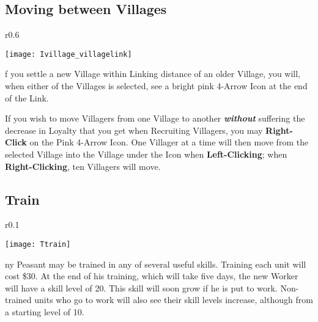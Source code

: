 \subsection{\textsf{Moving between Villages}}


\begin{wrapfigure}{r}{0.6\textwidth}
    \vspace{-20pt}
    \begin{center}
        \texttt{[image: Ivillage\_villagelink]} %
    \end{center}
    \vspace{-20pt}
\end{wrapfigure}

f you settle a new Village within Linking distance of an older Village, you will, when either of the Villages is selected, see a bright pink 4-Arrow Icon at the end of the Link.

If you wish to move Villagers from one Village to another \textbf{\textit{without}} suffering the decrease in Loyalty that you get when Recruiting Villagers, you may \textbf{Right-Click} on the Pink 4-Arrow Icon. One Villager at a time will then move from the selected Village into the Village under the Icon when \textbf{Left-Clicking}; when \textbf{Right-Clicking}, ten Villagers will move.

\subsection{Train}


\begin{wrapfigure}{r}{0.1\textwidth}
    \vspace{-20pt}
    \begin{center}
        \texttt{[image: Ttrain]}
    \end{center}
    \vspace{-20pt}
\end{wrapfigure}

ny Peasant may be trained in any of several useful skills. Training each unit will cost \$30. At the end of his training, which will take five days, the new Worker will have a skill level of 20. This skill will soon grow if he is put to work. Non-trained units who go to work will also see their skill levels increase, although from a starting level of 10.


